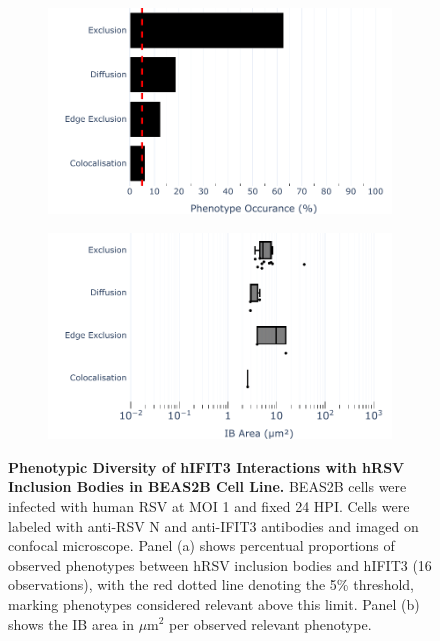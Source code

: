 \begin{figure}
    \begin{subfigure}{0.495\textwidth}
        \caption{}
        \includegraphics[width=1\linewidth]{08. Chapter 3/Figs/02. Infection/03. IFIT3/04. bar_i3_beas2b.pdf} 
    \end{subfigure}
    \begin{subfigure}{0.495\textwidth}
        \caption{}        
        \includegraphics[width=1\linewidth]{08. Chapter 3/Figs/02. Infection/03. IFIT3/05. box_i3_beas2b.pdf}
    \end{subfigure}
    \caption[Phenotypic Diversity of hIFIT3 Interactions with hRSV Inclusion Bodies in BEAS2B Cell Line.]{\textbf{Phenotypic Diversity of hIFIT3 Interactions with hRSV Inclusion Bodies in BEAS2B Cell Line.} BEAS2B cells were infected with human RSV at MOI 1 and fixed 24 HPI. Cells were labeled with anti-RSV N and anti-IFIT3 antibodies and imaged on confocal microscope. Panel (a) shows percentual proportions of observed phenotypes between hRSV inclusion bodies and hIFIT3 (16 observations), with the red dotted line denoting the 5\% threshold, marking phenotypes considered relevant above this limit. Panel (b) shows the IB area in \(\mu \mbox{m}^2\) per observed relevant phenotype.}
    \label{fig:Phenotypic Diversity of hIFIT3 Interactions with hRSV Inclusion Bodies in BEAS2B Cell Line}
\end{figure}

